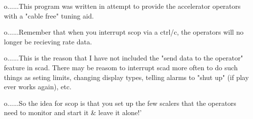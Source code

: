    o......This program was written  in  attempt  to  provide  the  accelerator
          operators with a "cable free" tuning aid.
 
   o......Remember  that  when  you interrupt scop via a ctrl/c, the operators
          will no longer be recieving rate data.
 
   o......This is the reason that I have not included the "send  data  to  the
          operator"  feature  in  scad.  There may be reasom to interrupt scad
          more often to do such things  as  seting  limits,  changing  display
          types, telling alarms to "shut up" (if play ever works again), etc.
 
   o......So  the  idea  for  scop is that you set up the few scalers that the
          operators need to monitor and start it & leave it alone!'
